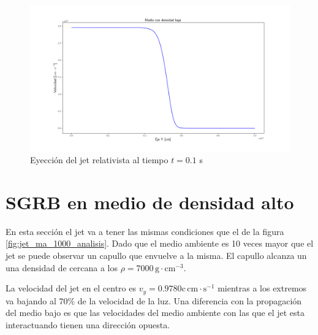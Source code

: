 \documentclass[12pt,a4paper]{book}
\begin{document}
\begin{figure}
\centering
\includegraphics[scale=0.4]{./Figuras/densidad_de_medios_ambientes/medio_bajo/vel_baja}
\caption{\label{fig:velocidades_baja}Eyección del jet relativista al tiempo $t = 0.1$ s}
\end{figure}





\section{SGRB en medio de densidad alto}
En esta sección el jet va a tener las mismas condiciones que el de la figura \ref{fig:jet_ma_1000_analisis}. Dado que el medio ambiente es 10 veces mayor que el jet se puede observar un capullo que envuelve a la misma. El capullo alcanza un una densidad de cercana a los $\rho = 7000 \, \mathrm{g} \cdot \mathrm{cm}^{-3}$.

La velocidad del jet en el centro es $v_y = 0.9780 \mathrm{c} \, \mathrm{cm}\cdot \mathrm{s}^{-1}$ mientras a los extremos va bajando al 70\% de la velocidad de la luz. Una diferencia con la propagación del medio bajo es que las velocidades del medio ambiente con las que el jet esta interactuando tienen una dirección opuesta.
\end{document}
